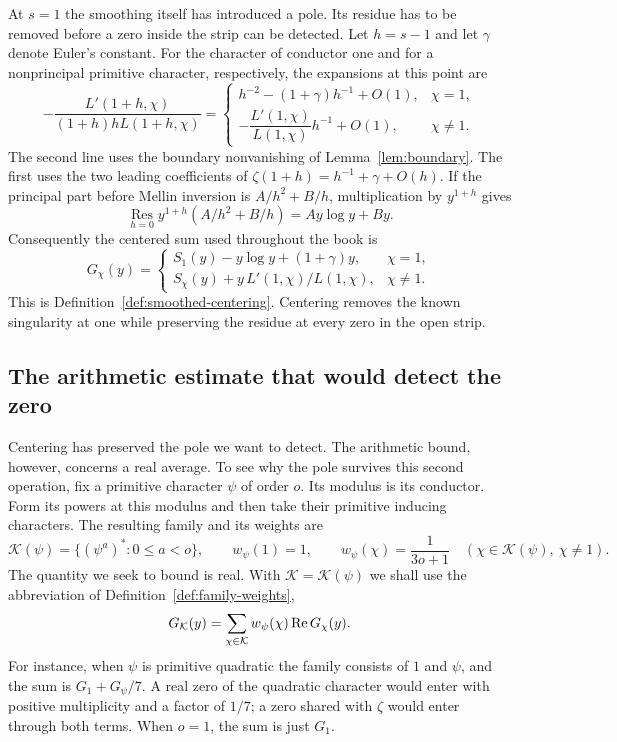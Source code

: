 At \(s=1\) the smoothing itself has introduced a pole. Its residue
has to be removed before a zero inside the strip can be detected.
Let \(h=s-1\) and let \(\gamma\) denote Euler's constant. For the
character of conductor one and for a nonprincipal primitive character,
respectively, the expansions at this point are
\[
 -\frac{L'(1+h,\chi)}{(1+h)hL(1+h,\chi)}
 =\begin{cases}
 h^{-2}-(1+\gamma)h^{-1}+O(1),&\chi=1,\\
 -\dfrac{L'(1,\chi)}{L(1,\chi)}h^{-1}+O(1),&\chi\ne1 .
 \end{cases}
\]
The second line uses the boundary nonvanishing of
Lemma~\ref{lem:boundary}. The first uses the two leading coefficients
of \(\zeta(1+h)=h^{-1}+\gamma+O(h)\). If the principal part before
Mellin inversion is \(A/h^2+B/h\), multiplication by \(y^{1+h}\) gives
\[
      \operatorname*{Res}_{h=0}
      y^{1+h}(A/h^2+B/h)=Ay\log y+By .
\]
Consequently the centered sum used throughout the book is
\[
 G_\chi(y)=
 \begin{cases}
 S_1(y)-y\log y+(1+\gamma)y,&\chi=1,\\
 S_\chi(y)+y\,L'(1,\chi)/L(1,\chi),&\chi\ne1 .
 \end{cases}
\]
This is Definition~\ref{def:smoothed-centering}. Centering removes the
known singularity at one while preserving the residue at every zero
in the open strip.

\subsection{The arithmetic estimate that would detect the zero}

Centering has preserved the pole we want to detect. The arithmetic bound, however,
concerns a real average. To see why the pole survives this second operation, fix a
primitive character \(\psi\) of order \(o\). Its modulus is its
conductor. Form its powers at this modulus and then take their primitive
inducing characters. The resulting family and its weights are
\[
 \mathcal K(\psi)=\{(\psi^a)^*:0\le a<o\},\qquad
 w_\psi(1)=1,\qquad
 w_\psi(\chi)=\frac1{3o+1}\quad(\chi\in\mathcal K(\psi),\ \chi\ne1).
\]
The quantity we seek to bound is real. With \(\mathcal K=\mathcal K(\psi)\)
we shall use the abbreviation of Definition~\ref{def:family-weights},
\[
             G_{\mathcal K}(y)=
         \sum_{\chi\in\mathcal K}w_\psi(\chi)\operatorname{Re} G_\chi(y).
\]
For instance, when \(\psi\) is primitive quadratic the family consists
of \(1\) and \(\psi\), and the sum is \(G_1+G_\psi/7\).
A real zero of the quadratic character would enter with positive
multiplicity and a factor of \(1/7\); a zero shared with \(\zeta\)
would enter through both terms. When \(o=1\), the sum is just \(G_1\).

